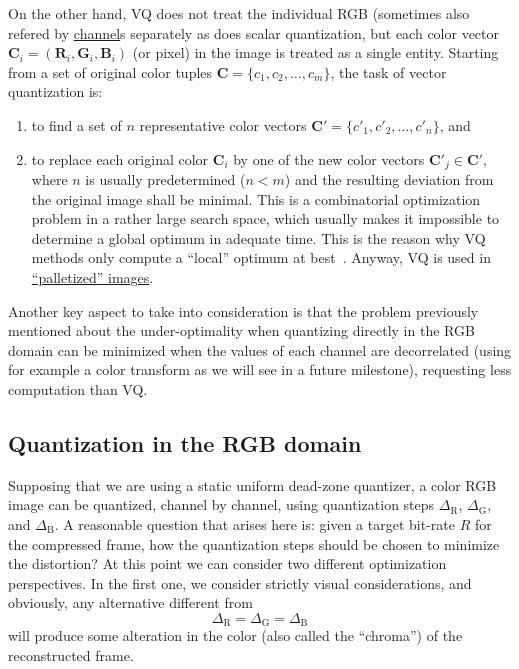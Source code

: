 On the other hand, VQ does not treat the individual RGB (sometimes
also refered by
\href{https://en.wikipedia.org/wiki/Color_image}{channel}s separately
as does scalar quantization, but each color vector
${\mathbf C}_i = ({\mathbf R}_i, {\mathbf G}_i, {\mathbf B}_i )$ (or
pixel) in the image is treated as a single entity. Starting from a set
of original color tuples ${\mathbf C} = \{c_1, c_2, \ldots ,c_m\}$,
the task of vector quantization is:
\begin{enumerate}
\item to ﬁnd a set of $n$ representative color vectors
  ${\mathbf C}' = \{c'_1, c'_2 ,\ldots , c'_n \}$, and
\item to replace each original color ${\mathbf C}_i$ by one of the new
  color vectors ${\mathbf C}'_j\in {\mathbf C}'$, where $n$ is usually
  predetermined ($n < m$) and the resulting deviation from the
  original image shall be minimal. This is a combinatorial
  optimization problem in a rather large search space, which usually
  makes it impossible to determine a global optimum in adequate
  time. This is the reason why VQ methods only compute a ``local''
  optimum at best~\cite{burger2016digital}. Anyway, VQ is used in
  \href{https://en.wikipedia.org/wiki/Palette_(computing)}{``palletized''
    images}.
\end{enumerate}

Another key aspect to take into consideration is that the problem
previously mentioned about the under-optimality when quantizing
directly in the RGB domain can be minimized when the values of each
channel are decorrelated (using for example a color transform
as we will see in a future milestone), requesting less computation
than VQ.

\subsection{Quantization in the RGB domain}
Supposing that we are using a static uniform dead-zone quantizer, a
color RGB image can be quantized, channel by channel, using
quantization steps $\Delta_{\text{R}}$, $\Delta_{\text{G}}$, and
$\Delta_{\text{B}}$. A reasonable question that arises here is: given
a target bit-rate $R$ for the compressed frame, how the quantization
steps should be chosen to minimize the distortion? At this point we
can consider two different optimization perspectives. In the first
one, we consider strictly visual considerations, and obviously, any
alternative different from
\begin{equation}
  \Delta_{\text{R}} = \Delta_{\text{G}} = \Delta_{\text{B}}
  \label{eq:simple_Q}
\end{equation}
will produce some alteration in the color (also called the
``chroma'') of the reconstructed frame.

